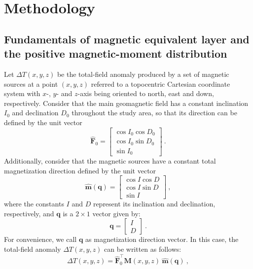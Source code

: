 \section{Methodology}
\label{sec:methodology}

\subsection{Fundamentals of magnetic equivalent layer and the positive magnetic-moment distribution}
\label{subsec:mag_eqlayer}

Let $\Delta T(x, y, z)$ be the total-field anomaly produced by a set of magnetic
sources at a point $(x, y, z)$ referred to a topocentric Cartesian coordinate system 
with $x$-, $y$- and $z$-axis being oriented to north, east and down, respectively.
Consider that the main geomagnetic field has a constant inclination $I_{0}$ and declination
$D_{0}$ throughout the study area, so that its direction can be defined by the unit vector
\begin{equation}
\hat{\mathbf{F}}_{0} = \begin{bmatrix}
\cos I_{0} \cos D_{0} \\
\cos I_{0} \sin D_{0} \\
\sin I_{0}
\end{bmatrix} \: .
\label{eq:main_field}
\end{equation}
Additionally, consider that the magnetic sources have a constant total magnetization 
direction defined by the unit vector
\begin{equation}
\hat{\mathbf{m}}(\mathbf{q}) = \begin{bmatrix}
\cos {I} \cos {D} \\
\cos {I} \sin {D} \\
\sin {I}
\end{bmatrix} \: ,
\label{eq:mag_vec}
\end{equation}
where the constants $I$ and $D$ represent its inclination and declination, respectively,
and $\mathbf{q}$ is a $2 \times 1$ vector given by:
\begin{equation}
\mathbf{q} = \begin{bmatrix}
I \\ 
D
\end{bmatrix} \: .
\label{eq:q_vector}
\end{equation}
For convenience, we call $\mathbf{q}$ as magnetization direction vector.
In this case, the total-field anomaly $\Delta T(x, y, z)$ can be written as follows:
\begin{equation}
\Delta T(x, y, z) = \hat{\mathbf{F}}_{0}^{\top} \mathbf{M}(x, y, z) \: 
\hat{\mathbf{m}}(\mathbf{q}) \: ,
\label{eq:tfanomaly}
\end{equation}
